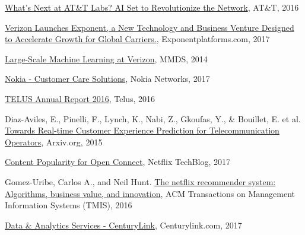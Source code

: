 \documentclass[12pt]{article}
\begin{document}
\begin{thebibliography}{9}
	\href{http://about.att.com/innovationblog/next_att_labs}{What’s Next at AT\&T Labs? AI Set to Revolutionize the Network}, 
	AT\&T, 
	2016
	
	\href{http://www.exponentplatforms.com/verizon-launches-exponent}{Verizon Launches Exponent, a New Technology and Business Venture Designed to Accelerate Growth for Global Carriers.}, 
	Exponentplatforms.com, 
	2017
	
	\href{http://mmds-data.org/presentations/2014/srivastava_mmds14.pdf}{Large-Scale Machine Learning at Verizon}, 
	MMDS, 
	2014
	
	\href{https://networks.nokia.com/solutions/customer-care}{Nokia - Customer Care Solutions}, 
	Nokia Networks, 
	2017
	
	\href{http://about.telus.com/investors/annualreport2016/?lang=en}{TELUS Annual Report 2016}, 
	Telus, 
	2016
	
	Diaz-Aviles, E., Pinelli, F., Lynch, K., Nabi, Z., Gkoufas, Y., \& Bouillet, E. et al. 
	\href{https://arxiv.org/abs/1508.02884}{Towards Real-time Customer Experience Prediction for Telecommunication Operators}, 
	Arxiv.org, 
	2015
	
	\href{https://medium.com/netflix-techblog/content-popularity-for-open-connect-b86d56f613b}{Content Popularity for Open Connect}, 
	Netflix TechBlog, 
	2017
	
	Gomez-Uribe, Carlos A., and Neil Hunt.
	\href{https://medium.com/netflix-techblog/content-popularity-for-open-connect-b86d56f613b}{The netflix recommender system: Algorithms, business value, and innovation}, 
	ACM Transactions on Management Information Systems (TMIS), 
	2016

	\href{http://www.centurylink.com/business/enterprise/it-consulting/data-analytics.html}{Data \& Analytics Services - CenturyLink}, 
	Centurylink.com, 
	2017


\end{thebibliography}
\end{document}
